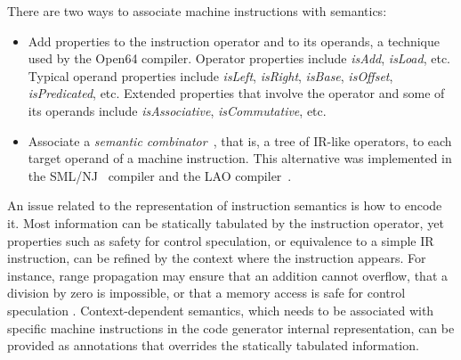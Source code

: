 There are two ways to associate machine instructions with semantics: \begin{itemize}

\item Add properties to the instruction operator and to
its operands, a technique used by the Open64 compiler. Operator properties
include \emph{isAdd}, \emph{isLoad}, etc. Typical operand properties include
\emph{isLeft}, \emph{isRight}, \emph{isBase}, \emph{isOffset},
\emph{isPredicated}, etc. Extended properties that involve the operator and some
of its operands include \emph{isAssociative}, \emph{isCommutative}, etc.  \item
Associate a \emph{semantic combinator}~\cite{Wand:1983:IC}, that is, a tree of IR-like operators, to
each target operand of a machine instruction. This alternative
was implemented in the SML/NJ~\cite{Leung:1999:PLDI} compiler and the LAO
compiler~\cite{Dinechin:2000:CASES}.  \end{itemize}

An issue related to the representation of instruction semantics is how to
encode it. Most information can be statically tabulated by the instruction
operator, yet properties such as safety for control speculation, or equivalence
to a simple IR instruction, can be refined by the context where the instruction
appears. For instance, range propagation may ensure that an addition cannot
overflow, that a division by zero is impossible, or that a memory access is
safe for control speculation . Context-dependent semantics, which needs to be
associated with specific machine instructions in the code generator internal
representation, can be provided as annotations that overrides the statically
tabulated information.

